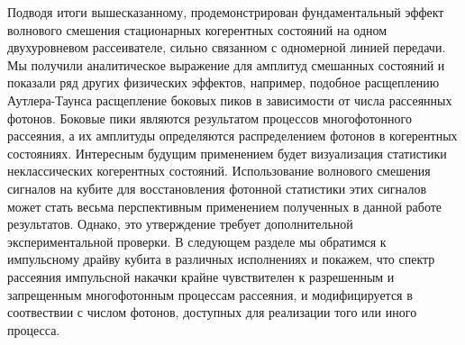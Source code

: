 Подводя итоги вышесказанному, продемонстрирован фундаментальный эффект волнового смешения стационарных когерентных состояний на одном двухуровневом рассеивателе, сильно связанном с одномерной линией передачи. Мы получили аналитическое выражение для амплитуд смешанных состояний и показали ряд других физических эффектов, например, подобное расщеплению Аутлера-Таунса расщепление боковых пиков в зависимости от числа рассеянных фотонов. Боковые пики являются результатом процессов многофотонного рассеяния, а их амплитуды определяются распределением фотонов в когерентных состояниях. Интересным будущим применением будет визуализация статистики неклассических когерентных состояний. Использование волнового смешения сигналов на кубите для восстановления фотонной статистики этих сигналов может стать весьма перспективным применением полученных в данной работе результатов. Однако, это утверждение требует дополнительной экспериментальной проверки. В следующем разделе мы обратимся к импульсному драйву кубита в различных исполнениях и покажем, что спектр рассеяния импульсной накачки крайне чувствителен к разрешенным и запрещенным многофотонным процессам рассеяния, и модифицируется в соотвествии с числом фотонов, доступных для реализации того или иного процесса. 


 





